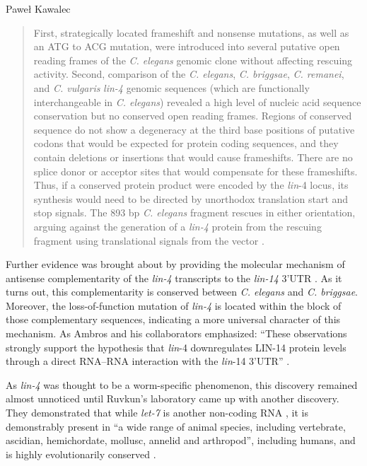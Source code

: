 \begin{artengenv}{Paweł Kawalec}
\begin{quotation}
First, strategically located frameshift and nonsense mutations, as well as an ATG to ACG mutation, were introduced into several putative open reading frames of the \textit{C. elegans} genomic clone without affecting rescuing activity. Second, comparison of the \textit{C. elegans}, \textit{C. briggsae}, \textit{C. remanei}, and \textit{C. vulgaris} \textit{lin-4} genomic sequences (which are functionally interchangeable in \textit{C. elegans}) revealed a high level of nucleic acid sequence conservation but no conserved open reading frames. Regions of conserved sequence do not show a degeneracy at the third base positions of putative codons that would be expected for protein coding sequences, and they contain deletions or insertions that would cause frameshifts. There are no splice donor or acceptor sites that would compensate for these frameshifts. Thus, if a conserved protein product were encoded by the \textit{lin}-4 locus, its synthesis would need to be directed by unorthodox translation start and stop signals. The 893 bp \textit{C. elegans} fragment rescues in either orientation, arguing against the generation of a \textit{lin-4} protein from the rescuing fragment using translational signals from the vector
\parencite[][p.849]{lee_c_1993}.%


\end{quotation}
Further evidence was brought about by providing the molecular mechanism of antisense complementarity of the \textit{lin-4} transcripts to the \textit{lin-14} 3'UTR
\parencite[][]{wightman_posttranscriptional_1993}. %
 As it turns out, this complementarity is conserved between \textit{C. elegans} and \textit{C. briggsae}. Moreover, the loss-of-function mutation of \textit{lin-4} is located within the block of those complementary sequences, indicating a more universal character of this mechanism. As Ambros and his collaborators emphasized: ``These observations strongly support the hypothesis that \textit{lin}-4 downregulates LIN-14 protein levels through a direct RNA–RNA interaction with the \textit{lin}-14 3'UTR''
\parencite[][p.850]{lee_c_1993}.%


As \textit{lin-4} was thought to be a worm-specific phenomenon, this discovery remained almost unnoticed until Ruvkun's laboratory came up with another discovery. They demonstrated that while \textit{let-7} is another non-coding RNA
\parencite[][]{reinhart_21-nucleotide_2000}, %
 it is demonstrably present in ``a wide range of animal species, including vertebrate, ascidian, hemichordate, mollusc, annelid and arthropod'', including humans, and is highly evolutionarily conserved 
\parencite[][p.86]{pasquinelli_conservation_2000}.%



\end{artengenv}
